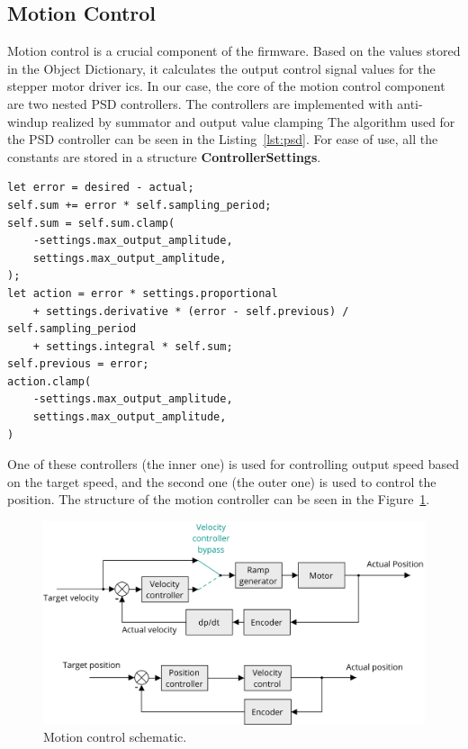 \subsection{Motion Control}
\label{subsec:motion_control}
Motion control is a crucial component of the firmware.
Based on the values stored in the Object Dictionary, it calculates the output control signal values for the stepper motor driver \acs{ic}s.
In our case, the core of the motion control component are two nested PSD controllers.
The controllers are implemented with anti-windup realized by summator and output value clamping
The algorithm used for the PSD controller can be seen in the Listing~\ref{lst:psd}.
For ease of use, all the constants are stored in a structure \textbf{ControllerSettings}.
\begin{lstlisting}[caption={Implementation of the PSD controller with integrator.},label=lst:psd]
let error = desired - actual;
self.sum += error * self.sampling_period;
self.sum = self.sum.clamp(
    -settings.max_output_amplitude,
    settings.max_output_amplitude,
);
let action = error * settings.proportional
    + settings.derivative * (error - self.previous) / self.sampling_period
    + settings.integral * self.sum;
self.previous = error;
action.clamp(
    -settings.max_output_amplitude,
    settings.max_output_amplitude,
)
\end{lstlisting}

One of these controllers (the inner one) is used for controlling output speed based on the target speed, and the second one (the outer one) is used to control the position.
The structure of the motion controller can be seen in the Figure~\ref{fig:motion_control}.

\begin{figure}[H]
    \centering
    \includegraphics[width=\textwidth]{obrazky/motion_control}
    \caption{Motion control schematic.}
    \label{fig:motion_control}
\end{figure}

